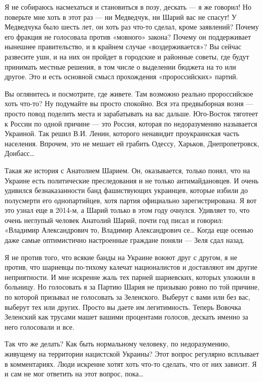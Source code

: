 Я не собираюсь насмехаться и становиться в позу, дескать --- я же говорил! Но
поверьте мне хоть в этот раз --- ни Медведчук, ни Шарий вас не спасут! У
Медведчука было шесть лет, он хоть раз что-то сделал, кроме заявлений? Почему
его фракция не голосовала против «мовного» закона? Почему он поддерживает
нынешнее правительство, и в крайнем случае «воздерживается»? Вы сейчас
развесите уши, и на них он пройдет в городские и районные советы, где будут
принимать местные решения, в том числе о выделении бюджета на то или другое.
Это и есть основной смысл прохождения «пророссийских» партий.

Вы оглянитесь и посмотрите, где живете. Там возможно реально пророссийское хоть
что-то? Ну подумайте вы просто спокойно. Вся эта предвыборная возня --- просто
повод поделить места и зарабатывать на вас дальше. Юго-Восток тяготеет к России
по одной причине --- это Россия, которая по недоразумению называется Украиной.
Так решил В.И. Ленин, которого ненавидит проукраинская часть населения.
Впрочем, это не мешает ей грабить Одессу, Харьков, Днепропетровск, Донбасс…

Такая же история с Анатолием Шарием. Он, оказывается, только понял, что на
Украине есть политические преследования и не только антимайдановцев. И очень
удивился безнаказанности банд фашиствующих украинцев, которые избили до
полусмерти его однопартийцев, хотя партия официально зарегистрирована. Я вот
это узнал еще в 2014-м, а Шарий только в этом году очнулся. Удивляет то, что
очень неглупый человек Анатолий Шарий, почти год писал и говорил: «Владимир
Александрович то, Владимир Александрович се… Когда еще осенью даже самые
оптимистично настроенные граждане поняли --- Зеля сдал назад.

Я не против того, что всякие банды на Украине воюют друг с другом, я не против,
что шариевцы по-тихому калечат националистов и доставляют им другие
неприятности. И мне искренне жаль тех парней шариевских, которых уложили в
больницу. Но голосовать я за Партию Шария не призываю ровно по той причине, по
которой призывал не голосовать за Зеленского. Выберут с вами или без вас,
выберут тех или других. Просто вы даете им легитимность. Теперь Вовочка
Зеленский как трусами машет вашими процентами голосов, дескать именно за него
голосовали и все.

Так что же делать? Как быть нормальному человеку, по недоразумению, живущему на
территории нацистской Украины? Этот вопрос регулярно всплывает в комментариях.
Люди искренне хотят хоть что-то сделать, что от них зависит. Я и сам не мог
ответить на этот вопрос, пока…

